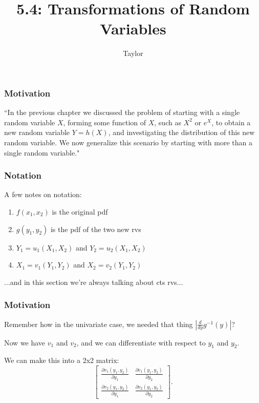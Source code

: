 \documentclass{beamer}
\title["5.4"]{5.4: Transformations of Random Variables}
\author{Taylor}
\institute[UVA] 
{
University of Virginia \\
\medskip
\textit{} 
}
\date{}
\begin{document}

\begin{frame}
\titlepage 
\end{frame}

\begin{frame}
\frametitle{Motivation}

``In the previous chapter we discussed the problem of starting with a single random variable $X$, forming some function of $X$, such as $X^2$ or $e^X$, to obtain a new random variable $Y = h(X)$, and investigating the distribution of this new random variable. We now generalize this scenario by starting with more than a single random variable."

\end{frame}

\begin{frame}
\frametitle{Notation}

A few notes on notation:
\begin{enumerate}
\item $f(x_1, x_2)$ is the original pdf 
\item $g(y_1, y_2)$ is the pdf of the two new rvs
\item $Y_1 = u_1(X_1, X_2)$ and $Y_2 = u_2(X_1, X_2)$
\item $X_1 = v_1(Y_1, Y_2)$ and $X_2 = v_2(Y_1, Y_2)$
\end{enumerate}

...and in this section we're always talking about cts rvs...

\end{frame}

\begin{frame}
\frametitle{Motivation}

Remember how in the univariate case, we needed that thing $\left| \frac{d}{dy}g^{-1}(y) \right|$?
\newline

Now we have $v_1$ and $v_2$, and we can differentiate with respect to $y_1$ and $y_2$.
\newline

We can make this into a 2x2 matrix:
\[
\left[ \begin{array}{cc}
\frac{\partial v_1(y_1, y_2)}{\partial y_1} & \frac{\partial v_1(y_1, y_2)}{\partial y_2} \\
\frac{\partial v_2(y_1, y_2)}{\partial y_1} & \frac{\partial v_2(y_1, y_2)}{\partial y_2}  \end{array} \right].
\] 
\end{frame}
\end{document}
